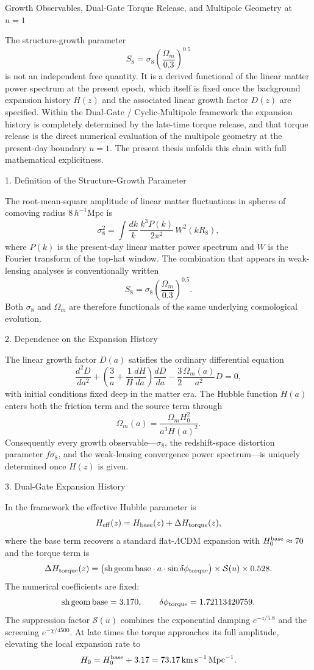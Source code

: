 Growth Observables, Dual-Gate Torque Release, and Multipole Geometry at \(u=1\)

The structure-growth parameter  
\[
S_8=\sigma_8\left(\frac{\Omega_m}{0.3}\right)^{0.5}
\]  
is not an independent free quantity. It is a derived functional of the linear matter power spectrum at the present epoch, which itself is fixed once the background expansion history \(H(z)\) and the associated linear growth factor \(D(z)\) are specified. Within the Dual-Gate / Cyclic-Multipole framework the expansion history is completely determined by the late-time torque release, and that torque release is the direct numerical evaluation of the multipole geometry at the present-day boundary \(u=1\). The present thesis unfolds this chain with full mathematical explicitness.

1. Definition of the Structure-Growth Parameter

The root-mean-square amplitude of linear matter fluctuations in spheres of comoving radius \(8\,h^{-1}\mathrm{Mpc}\) is
\[
\sigma_8^2=\int\frac{dk}{k}\,\frac{k^3P(k)}{2\pi^2}\,W^2(kR_8),
\]  
where \(P(k)\) is the present-day linear matter power spectrum and \(W\) is the Fourier transform of the top-hat window. The combination that appears in weak-lensing analyses is conventionally written
\[
S_8=\sigma_8\left(\frac{\Omega_m}{0.3}\right)^{0.5}.
\]  
Both \(\sigma_8\) and \(\Omega_m\) are therefore functionals of the same underlying cosmological evolution.

2. Dependence on the Expansion History

The linear growth factor \(D(a)\) satisfies the ordinary differential equation
\[
\frac{d^2D}{da^2}+\left(\frac{3}{a}+\frac{1}{H}\frac{dH}{da}\right)\frac{dD}{da}-\frac{3}{2}\frac{\Omega_m(a)}{a^2}D=0,
\]  
with initial conditions fixed deep in the matter era. The Hubble function \(H(a)\) enters both the friction term and the source term through
\[
\Omega_m(a)=\frac{\Omega_m H_0^2}{a^3H(a)^2}.
\]  
Consequently every growth observable—\(\sigma_8\), the redshift-space distortion parameter \(f\sigma_8\), and the weak-lensing convergence power spectrum—is uniquely determined once \(H(z)\) is given.

3. Dual-Gate Expansion History

In the framework the effective Hubble parameter is
\[
H_{\rm eff}(z)=H_{\rm base}(z)+\Delta H_{\rm torque}(z),
\]  
where the base term recovers a standard flat-\(\Lambda\)CDM expansion with \(H_0^{\rm base}\approx70\) and the torque term is
\[
\Delta H_{\rm torque}(z)=\bigl({\rm sh\,geom\,base}\cdot a\cdot\sin\delta\phi_{\rm torque}\bigr)\times\mathcal{S}(u)\times0.528.
\]  
The numerical coefficients are fixed:
\[
{\rm sh\,geom\,base}=3.170,\qquad\delta\phi_{\rm torque}=1.72113420759.
\]  
The suppression factor \(\mathcal{S}(u)\) combines the exponential damping \(e^{-z/5.8}\) and the screening \(e^{-\chi/4500}\). At late times the torque approaches its full amplitude, elevating the local expansion rate to
\[
H_0=H_0^{\rm base}+3.17=73.17\,\mathrm{km\,s^{-1}\,Mpc^{-1}}.
\]

